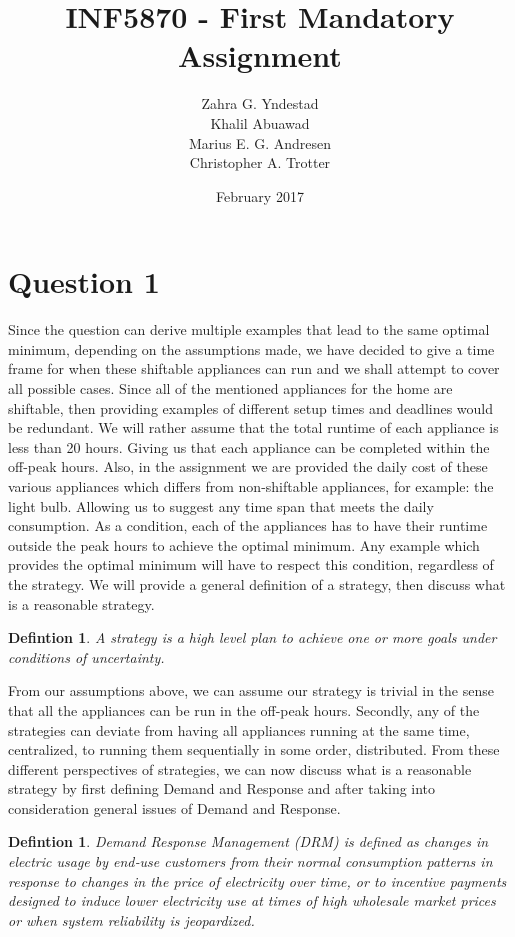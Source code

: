 \documentclass{article}
\title{INF5870 - First Mandatory Assignment}
\author{Zahra G. Yndestad \\ Khalil Abuawad \\ Marius E. G. Andresen \\ Christopher A. Trotter}
\date{February 2017}
\newtheorem{definition}[theorem]{Defintion}
\begin{document}
\maketitle

\section{Question 1}
	Since the question can derive multiple examples that lead to the same optimal minimum, depending on the assumptions made, we have decided to give a time frame for when these shiftable appliances can run and we shall attempt to cover all possible cases. Since all of the mentioned appliances for the home are shiftable, then providing examples of different setup times and deadlines would be redundant. We will rather assume that the total runtime of each appliance is less than 20 hours. Giving us that each appliance can be completed within the off-peak hours. Also, in the assignment we are provided the daily cost of these various appliances which differs from non-shiftable appliances, for example: the light bulb. Allowing us to suggest any time span that meets the daily consumption.  As a condition, each of the appliances has to have their runtime outside the peak hours to achieve the optimal minimum. Any example which provides the optimal minimum will have to respect this condition, regardless of the strategy. We will provide a general definition of a strategy, then discuss what is a reasonable strategy.

	\begin{definition}
    	A strategy is a high level plan to achieve one or more goals under conditions of uncertainty{\cite{wikistrategy}}.
	\end{definition}

	From our assumptions above, we can assume our strategy is trivial in the sense that all the appliances can be run in the off-peak hours. Secondly, any of the strategies can deviate from having all appliances running at the same time, centralized, to running them sequentially in some order, distributed. From these different perspectives of strategies, we can now discuss what is a reasonable strategy by first defining Demand and Response and after taking into consideration general issues of Demand and Response.

	\begin{definition}
	    Demand Response Management (DRM) is defined as changes in electric usage by end‐use customers from their normal consumption patterns in response to changes in the price of electricity over time, or to incentive payments designed to induce lower electricity use at times of high wholesale market prices or when system reliability is jeopardized\cite{defDRM}.
	\end{definition}
\end{document}
